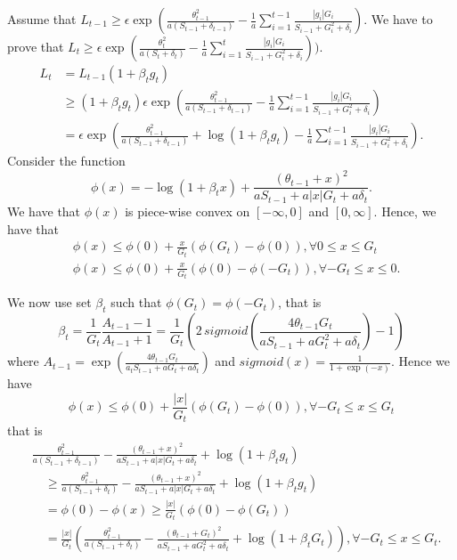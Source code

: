 Assume that $L_{t-1}\geq \epsilon \exp(\frac{\theta_{t-1}^2}{a (S_{t-1} + \delta_{t-1})}- \frac{1}{a}\sum_{i=1}^{t-1} \frac{|g_i| G_i}{S_{i-1} + G^2_i + \delta_{i}})$.
We have to prove that $L_{t}\geq \epsilon \exp(\frac{\theta_{t}^2}{a (S_t + \delta_t)}- \frac{1}{a}\sum_{i=1}^{t} \frac{|g_i| G_i}{S_{i-1} + G^2_i + \delta_i}))$.
\begin{align}
L_{t} &= L_{t-1} (1+\beta_t g_t) \\
&\geq (1+\beta_t g_t) \epsilon \exp(\frac{\theta_{t-1}^2}{a (S_{t-1}+\delta_{t-1})}- \frac{1}{a}\sum_{i=1}^{t-1} \frac{|g_i| G_i}{S_{i-1} + G^2_i + \delta_i}) \\
&=  \epsilon \exp(\frac{\theta_{t-1}^2}{a (S_{t-1}+\delta_{t-1})}+\log(1+\beta_t g_t)- \frac{1}{a}\sum_{i=1}^{t-1} \frac{|g_i| G_i}{S_{i-1} + G^2_i +\delta_i}) .
\end{align}
Consider the function 
\[
\phi(x)=-\log(1+\beta_t x) + \frac{(\theta_{t-1}+x)^2}{a S_{t-1} + a |x| G_t +a \delta_t}.
\]
We have that $\phi(x)$ is piece-wise convex on $[-\infty,0]$ and $[0,\infty]$. Hence, we have that
\begin{align}
&\phi(x) \leq \phi(0)+\frac{x}{G_t} (\phi(G_t)-\phi(0)), \forall 0 \leq x\leq G_t\\
&\phi(x) \leq \phi(0)+\frac{x}{G_t} (\phi(0)-\phi(-G_t)), \forall -G_t \leq x\leq 0.
\end{align}

We now use set $\beta_t$ such that $\phi(G_t)=\phi(-G_t)$, that is
\[
\beta_t = \frac{1}{G_t} \frac{A_{t-1}-1}{A_{t-1}+1} 
= \frac{1}{G_t} \left(2 \, sigmoid\left(\frac{4 \theta_{t-1} G_t}{a S_{t-1} + a G_t^2 + a \delta_t}\right)-1\right)
\]
where $A_{t-1}=\exp\left(\frac{4 \theta_{t-1} G_t}{a_{t} S_{t-1} + a G_t + a \delta_t }\right)$ and
$sigmoid (x) =\frac{1}{1+\exp(-x)}$.
Hence we have
\[
\phi(x) \leq \phi(0)+\frac{|x|}{G_t} (\phi(G_t)-\phi(0)), \forall -G_t \leq x\leq G_t
\]
that is
\begin{align}
&\frac{\theta_{t-1}^2}{a (S_{t-1}+\delta_{t-1})}-\frac{(\theta_{t-1}+x)^2}{a S_{t-1} + a |x| G_t + a\delta_t} + \log(1+\beta_t g_t) \\
&\quad \geq \frac{\theta_{t-1}^2}{a (S_{t-1}+\delta_{t})}-\frac{(\theta_{t-1}+x)^2}{a S_{t-1} + a |x| G_t + a\delta_t} + \log(1+\beta_t g_t) \\
&\quad = \phi(0) - \phi(x) 
\geq \frac{|x|}{G_t} (\phi(0) - \phi(G_t)) \\
&\quad = \frac{|x|}{G_t} (\frac{\theta_{t-1}^2}{a (S_{t-1}+\delta_t)} - \frac{(\theta_{t-1}+G_t)^2}{a S_{t-1} + a G_t^2 + a \delta_t} + \log(1+\beta_t G_t)), \forall -G_t \leq x\leq G_t.
\end{align}

